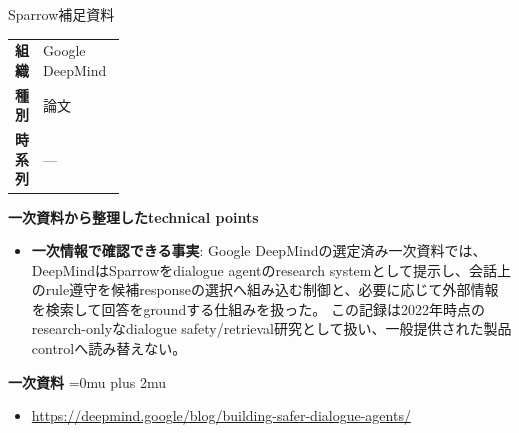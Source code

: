 \begin{technicalnote}{Sparrow}{補足資料}
\begingroup
\begin{tabularx}{\linewidth}{@{}>{\bfseries}p{0.22\linewidth}X@{}}
組織 & Google DeepMind \\
種別 & 論文 \\
時系列 & — \\
\end{tabularx}
\smallskip
{\bfseries 一次資料から整理したtechnical points}
\begin{itemize}[leftmargin=1.5em,itemsep=0.35em]
\item \textbf{一次情報で確認できる事実}: Google DeepMindの選定済み一次資料では、DeepMindはSparrowをdialogue agentのresearch systemとして提示し、会話上のrule遵守を候補responseの選択へ組み込む制御と、必要に応じて外部情報を検索して回答をgroundする仕組みを扱った。 この記録は2022年時点のresearch-onlyなdialogue safety/retrieval研究として扱い、一般提供された製品controlへ読み替えない。
\end{itemize}
\begin{minipage}{\linewidth}
\begin{samepage}
{\bfseries 一次資料}
\begingroup\sloppy
\Urlmuskip=0mu plus 2mu\relax
\begin{itemize}[leftmargin=1.5em,itemsep=0.25em]
\item {\scriptsize\url{https://deepmind.google/blog/building-safer-dialogue-agents/}}
\end{itemize}
\endgroup
\end{samepage}
\end{minipage}
\endgroup
\end{technicalnote}
\medskip

